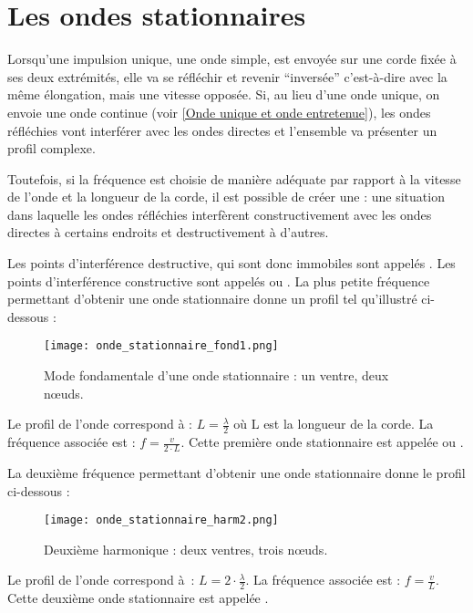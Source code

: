 \chapter{Les ondes stationnaires}
Lorsqu'une impulsion unique, une onde simple, est envoyée sur une corde fixée à ses deux extrémités, elle va se réfléchir et revenir \enquote{inversée} c'est-à-dire avec la même élongation, mais une vitesse opposée. Si, au lieu d'une onde unique, on envoie une onde continue (voir \ref{Onde unique et onde entretenue}), les ondes réfléchies vont interférer avec les ondes directes et l'ensemble va présenter un profil complexe.

Toutefois, si la fréquence est choisie de manière adéquate par rapport à la vitesse de l'onde et la longueur de la corde, il est possible de créer une  : une situation dans laquelle les ondes réfléchies interfèrent constructivement avec les ondes directes à certains endroits et destructivement à d'autres.


Les points d'interférence destructive, qui sont donc immobiles sont appelés . Les points d'interférence constructive sont appelés  ou .
La plus petite fréquence permettant d'obtenir une onde stationnaire donne un profil tel qu'illustré ci-dessous :

\begin{figure}[h!]
    \centering
    \texttt{[image: onde\_stationnaire\_fond1.png]}
    \caption{Mode fondamentale d'une onde stationnaire : un ventre, deux nœuds.}
\end{figure}

Le profil de l'onde correspond à : \(L=\frac{\lambda}{2}\) où L est la longueur de la corde. La fréquence associée est : \(f=\frac{v}{2 \cdot L}\). Cette première onde stationnaire est appelée  ou .

La deuxième fréquence permettant d'obtenir une onde stationnaire donne le profil ci-dessous :
\begin{figure}[h!]
    \centering
    \texttt{[image: onde\_stationnaire\_harm2.png]}
    \caption{Deuxième harmonique : deux ventres, trois nœuds.}
\end{figure}

Le profil de l'onde correspond à : \(L=2 \cdot \frac{\lambda}{2}\). La fréquence associée est : \(f=\frac{v}{ L}\). Cette deuxième onde stationnaire est appelée .

